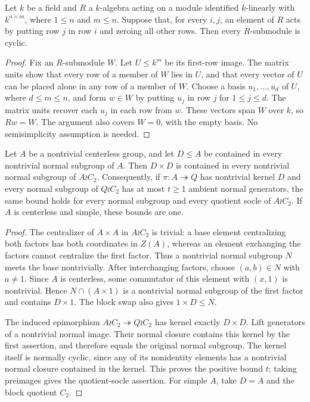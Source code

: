 \begin{lemma}
\label{lem:matrix-unit-uniform-cyclicity}
Let $k$ be a field and $R$ a $k$-algebra acting on a module identified
$k$-linearly with $k^{n\times m}$, where $1\leq n$ and $m\leq n$.
Suppose that, for every $i,j$, an element of $R$ acts by putting row $j$
in row $i$ and zeroing all other rows. Then every $R$-submodule is cyclic.
\end{lemma}
\begin{proof}
Fix an $R$-submodule $W$. Let $U\leq k^m$ be its first-row image.
The matrix units show that every row of a member of $W$ lies in $U$,
and that every vector of $U$ can be placed alone in any row of a member
of $W$. Choose a basis $u_1,\ldots,u_d$ of $U$, where $d\leq m\leq n$,
and form $w\in W$ by putting $u_j$ in row $j$ for $1\leq j\leq d$.
The matrix units recover each $u_j$ in each row from $w$.
These vectors span $W$ over $k$, so $Rw=W$. The argument also covers
$W=0$, with the empty basis. No semisimplicity assumption is needed.
\end{proof}

\begin{lemma}
\label{lem:wreath-normal-cover}
Let $A$ be a nontrivial centerless group, and let $D\leq A$ be contained
in every nontrivial normal subgroup of $A$. Then $D\times D$ is contained
in every nontrivial normal subgroup of $A\wr C_2$.
Consequently, if $\pi:A\twoheadrightarrow Q$ has nontrivial kernel $D$
and every normal subgroup of $Q\wr C_2$ has at most $t\geq1$ ambient
normal generators, the same bound holds for every normal subgroup and
every quotient socle of $A\wr C_2$.
If $A$ is centerless and simple, these bounds are one.
\end{lemma}
\begin{proof}
The centralizer of $A\times A$ in $A\wr C_2$ is trivial: a base element
centralizing both factors has both coordinates in $Z(A)$, whereas an
element exchanging the factors cannot centralize the first factor.
Thus a nontrivial normal subgroup $N$ meets the base nontrivially.
After interchanging factors, choose $(a,b)\in N$ with $a\ne1$.
Since $A$ is centerless, some commutator of this element with $(x,1)$
is nontrivial. Hence $N\cap(A\times1)$ is a nontrivial normal subgroup
of the first factor and contains $D\times1$. The block swap also gives
$1\times D\leq N$.

The induced epimorphism $A\wr C_2\twoheadrightarrow Q\wr C_2$ has
kernel exactly $D\times D$. Lift generators of a nontrivial normal
image. Their normal closure contains this kernel by the first assertion,
and therefore equals the original normal subgroup. The kernel itself
is normally cyclic, since any of its nonidentity elements has a
nontrivial normal closure contained in the kernel. This proves the
positive bound $t$; taking preimages gives the quotient-socle assertion.
For simple $A$, take $D=A$ and the block quotient $C_2$.
\end{proof}


